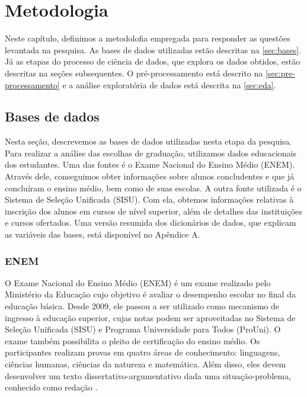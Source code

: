 
\chapter{Metodologia}
\label{chap:metodologia}

Neste capítulo, definimos a metodolofia empregada para responder as questões levantada na pesquisa. As bases de dados utilizadas estão descritas na \autoref{sec:bases}. Já as etapas do processo de ciência de dados, que explora os dados obtidos, estão descritas na seções subsequentes. O pré-processamento está descrito na \autoref{sec:pre-processamento} e a análise exploratória de dados está descrita na \autoref{sec:eda}.

\section{Bases de dados}
\label{sec:bases}
Nesta seção, descrevemos as bases de dados utilizadas nesta etapa da pesquisa. Para realizar a análise das escolhas de graduação, utilizamos dados educacionais dos estudantes. Uma das fontes é o Exame Nacional do Ensino Médio (ENEM). Através dele, conseguimos obter informações sobre alunos concludentes e que já concluíram o ensino médio, bem como de suas escolas. A outra fonte utilizada é o Sistema de Seleção Unificada (SISU). Com ela, obtemos informações relativas à inscrição dos alunos em cursos de nível superior, além de detalhes das instituições e cursos ofertados. Uma versão resumida dos dicionários de dados, que explicam as variáveis das bases, está disponível no Apêndice A. 

\subsection{ENEM}
O Exame Nacional do Ensino Médio (ENEM) é um exame realizado pelo Ministério da Educação cujo objetivo é avaliar o desempenho escolar no final da educação básica. Desde 2009, ele passou a ser utilizado como mecanismo de ingresso à educação superior, cujas notas podem ser aproveitadas no Sistema de Seleção Unificada (SISU) e Programa Universidade para Todos (ProUni). O exame também possibilita o pleito de certificação do ensino médio. Os participantes realizam provas em quatro áreas de conhecimento: linguagens, ciências humanas, ciências da natureza e matemática. Além disso, eles devem desenvolver um texto dissertativo-argumentativo dada uma situação-problema, conhecido como redação \autocite{inep:1}.

